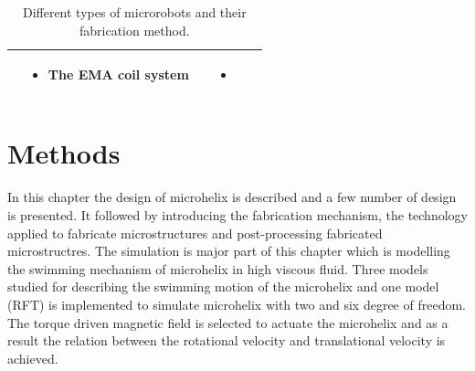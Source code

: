 \documentclass[12pt,a4paper,titlepage]{report}
\begin{document}
\begin{table}[h!]
\begin{tabular}{ c m{2.5cm}  m{4.3cm} m{3cm} m{2cm}}
\begin{minipage}[t]{3cm}
\begin{itemize}
      \end{itemize}
    \end{minipage}
    & 
    \begin{minipage}[t]{4cm}
      \begin{itemize}
        \item The EMA coil system
     
      \end{itemize}
    \end{minipage}
&



	&
	   \begin{itemize}
        \item \citep{ko2012jellyfish}
   
      \end{itemize}
    \\ \hline








  \end{tabular}
  
  \caption[Summery of microrobots\rq{}s desing, locomotion and fabrication]{Different types 
of microrobots and their fabrication method.}\label{Micro}
\end{table}



\chapter{Methods}

In this chapter the design of microhelix is described and a few number of design is presented. It followed by introducing
the fabrication mechanism, the technology applied to fabricate microstructures and post-processing fabricated microstructres.
The simulation is major part of this chapter which is modelling the swimming mechanism of microhelix in high viscous fluid. 
Three models studied for describing the swimming motion of the microhelix and one model (\ac*{RFT}) is implemented to simulate
microhelix with two and six degree of freedom. The torque driven magnetic field is selected to actuate the microhelix and
as a result the relation between the rotational velocity and translational velocity is achieved.    
\end{document}
